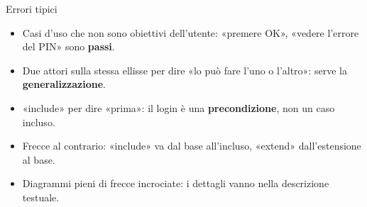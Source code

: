 \begin{attenzione}{Errori tipici}
\begin{itemize}[nosep, leftmargin=*]
  \item Casi d'uso che non sono obiettivi dell'utente: «premere OK», «vedere l'errore del PIN» sono \textbf{passi}.
  \item Due attori sulla stessa ellisse per dire «lo può fare l'uno o l'altro»: serve la \textbf{generalizzazione}.
  \item «include» per dire «prima»: il login è una \textbf{precondizione}, non un caso incluso.
  \item Frecce al contrario: «include» va dal base all'incluso, «extend» dall'estensione al base.
  \item Diagrammi pieni di frecce incrociate: i dettagli vanno nella descrizione testuale.
\end{itemize}
\end{attenzione}
